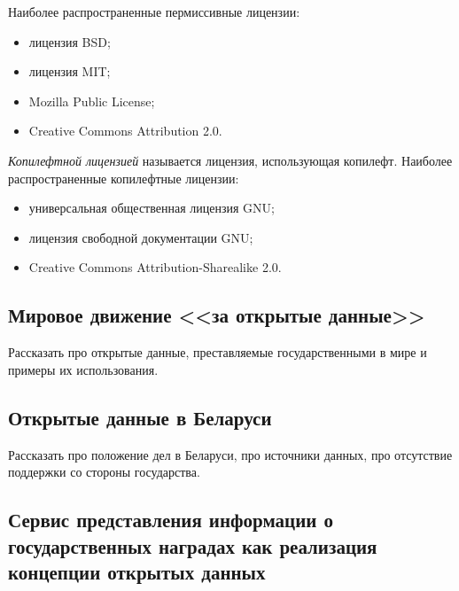 Наиболее распространенные пермиссивные лицензии:
\begin{itemize}
\item лицензия BSD;
\item лицензия MIT;
\item Mozilla Public License;
\item Creative Commons Attribution 2.0.
\end{itemize}

\textit{Копилефтной лицензией} называется лицензия, использующая копилефт.
Наиболее распространенные копилефтные лицензии:
\begin{itemize}
\item универсальная общественная лицензия GNU;
\item лицензия свободной документации GNU;
\item Creative Commons Attribution-Sharealike 2.0.
\end{itemize}

\subsection{Мировое движение <<за открытые данные>>}

Рассказать про открытые данные, преставляемые государственными в мире и
примеры их использования.

\subsection{Открытые данные в Беларуси}

Рассказать про положение дел в Беларуси, про источники данных, про отсутствие поддержки
со стороны государства.

\subsection{Сервис представления информации о государственных
  наградах как реализация концепции открытых данных}


